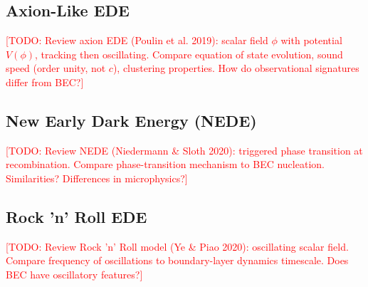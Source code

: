 \documentclass[11pt,a4paper]{article}
\theoremstyle{definition}
\theoremstyle{remark}
\begin{document}
\subsection{Axion-Like EDE}
\label{app:axion_ede}

\textcolor{red}{[TODO: Review axion EDE (Poulin et al. 2019): scalar field $\phi$ with potential $V(\phi)$, tracking then oscillating. Compare equation of state evolution, sound speed (order unity, not $c$), clustering properties. How do observational signatures differ from BEC?]}

\subsection{New Early Dark Energy (NEDE)}
\label{app:nede}

\textcolor{red}{[TODO: Review NEDE (Niedermann \& Sloth 2020): triggered phase transition at recombination. Compare phase-transition mechanism to BEC nucleation. Similarities? Differences in microphysics?]}

\subsection{Rock 'n' Roll EDE}
\label{app:rock_n_roll}

\textcolor{red}{[TODO: Review Rock 'n' Roll model (Ye \& Piao 2020): oscillating scalar field. Compare frequency of oscillations to boundary-layer dynamics timescale. Does BEC have oscillatory features?]}

\end{document}
